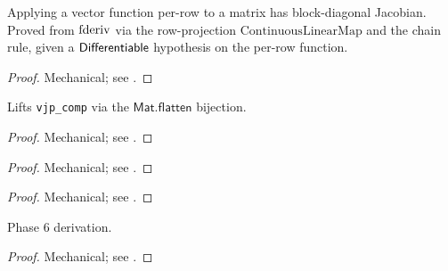 \begin{theorem}
  \label{ax:pdivMat_rowIndep}
  \leanok
  Applying a vector function per-row to a matrix has block-diagonal Jacobian.
  Proved from \(\operatorname{fderiv}\) via the row-projection \(\mathrm{ContinuousLinearMap}\)
  and the chain rule, given a \(\mathsf{Differentiable}\) hypothesis on the
  per-row function.
\end{theorem}

\begin{proof}
\leanok
Mechanical; see .
\end{proof}

\begin{theorem}
  \label{thm:vjpMat_comp}
  \leanok
  Lifts \texttt{vjp\_comp} via the \(\mathsf{Mat.flatten}\) bijection.
\end{theorem}

\begin{proof}
\leanok
Mechanical; see .
\end{proof}

\begin{theorem}
  \label{thm:biPathMat_has_vjp}
  \leanok
\end{theorem}

\begin{proof}
\leanok
Mechanical; see .
\end{proof}

\begin{theorem}
  \label{thm:identityMat_has_vjp}
  \leanok
\end{theorem}

\begin{proof}
\leanok
Mechanical; see .
\end{proof}

\begin{theorem}
  \label{thm:pdivMat_scalarScale}
  \leanok
  Phase 6 derivation.
\end{theorem}

\begin{proof}
\leanok
Mechanical; see .
\end{proof}

